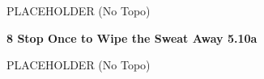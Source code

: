 \begin{multicols}{2}
			\begin{adjustwidth}{0.5cm}{}				
			PLACEHOLDER
				\newline (No Topo) 
			\end{adjustwidth}
			\label{rt:Stop Once to Wipe the Sweat Away}
\colorbox{RoyalBlue!20}{
\parbox{0.95\linewidth}{
\textbf{
8 Stop Once to Wipe the Sweat Away 5.10a  
}
}
}

			\begin{adjustwidth}{0.5cm}{}				
			PLACEHOLDER
				\newline (No Topo) 
			\end{adjustwidth}
\end{multicols}
\clearpage